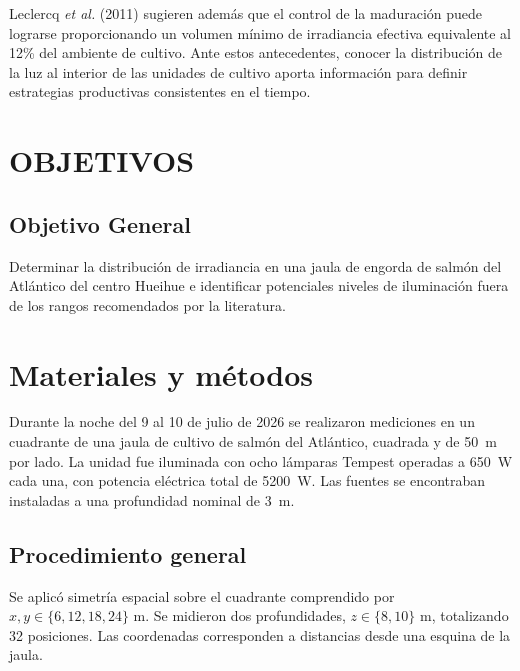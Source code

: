 \documentclass[11pt,letterpaper]{article}
\begin{document}
Leclercq \emph{et al.} (2011) sugieren además que el control de la maduración puede lograrse proporcionando un volumen mínimo de irradiancia efectiva equivalente al 12\% del ambiente de cultivo. Ante estos antecedentes, conocer la distribución de la luz al interior de las unidades de cultivo aporta información para definir estrategias productivas consistentes en el tiempo.

\section{OBJETIVOS}

\subsection{Objetivo General}

Determinar la distribución de irradiancia en una jaula de engorda de salmón del Atlántico del centro Hueihue e identificar potenciales niveles de iluminación fuera de los rangos recomendados por la literatura.

\section{Materiales y métodos}

Durante la noche del 9 al 10 de julio de 2026 se realizaron mediciones en un cuadrante de una jaula de cultivo de salmón del Atlántico, cuadrada y de \SI{50}{\metre} por lado. La unidad fue iluminada con ocho lámparas Tempest operadas a \SI{650}{\watt} cada una, con potencia eléctrica total de \SI{5200}{\watt}. Las fuentes se encontraban instaladas a una profundidad nominal de \SI{3}{\metre}.

\subsection{Procedimiento general}

Se aplicó simetría espacial sobre el cuadrante comprendido por $x,y\in\{6,12,18,24\}$ m. Se midieron dos profundidades, $z\in\{8,10\}$ m, totalizando 32 posiciones. Las coordenadas corresponden a distancias desde una esquina de la jaula.
\end{document}
